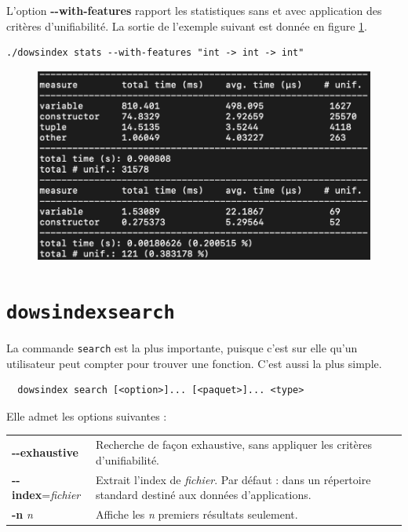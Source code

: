 \documentclass[a4paper]{report}
\theoremstyle{definition}
\newcommand{\dowsindex}{\texttt{dowsindex}\xspace}
\begin{document}
L'option \textbf{-{}-with-features} rapport les statistiques sans et avec application des critères d'unifiabilité. La sortie de l'exemple suivant est donnée en figure \ref{fig_dowsindex_save}.

\begin{verbatim}
./dowsindex stats --with-features "int -> int -> int"
\end{verbatim}

\begin{figure}[h]
  \begin{center}
    \includegraphics[scale=0.22]{images/dowsindex-save}
  \end{center}
  \caption{\label{fig_dowsindex_save}}
\end{figure}


\section{\dowsindex \texttt{search}}

La commande \texttt{search} est la plus importante, puisque c'est sur elle qu'un utilisateur peut compter pour trouver une fonction. C'est aussi la plus simple.

\begin{center}
  \begin{verbatim}
  dowsindex search [<option>]... [<paquet>]... <type>
  \end{verbatim}
\end{center}

Elle admet les options suivantes :

\begin{table}[h]
  \begin{tabularx}{\textwidth}{lX}
      \textbf{-{}-exhaustive} &
      Recherche de façon exhaustive, sans appliquer les critères d'unifiabilité.
    \\
      \textbf{-{}-index}=\textit{fichier} &
      Extrait l'index de \textit{fichier}. Par défaut : dans un répertoire standard destiné aux données d'applications.
    \\
      \textbf{-n} \textit{n} &
      Affiche les \textit{n} premiers résultats seulement.
  \end{tabularx}
\end{table}
\end{document}
